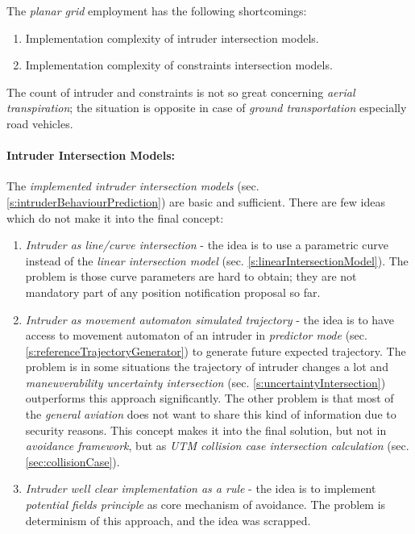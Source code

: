 \noindent The \emph{planar grid} employment has the following shortcomings:
\begin{enumerate}
    \item Implementation complexity of intruder intersection models.
    \item Implementation complexity of constraints intersection models.
\end{enumerate}

\begin{note}
    The count of intruder and constraints is not so great concerning \emph{aerial transpiration}; the situation is opposite in case of \emph{ground transportation} especially road vehicles. 
\end{note}

\paragraph{Intruder Intersection Models:} The \emph{implemented intruder intersection models} (sec. \ref{s:intruderBehaviourPrediction}) are basic and sufficient. There are few ideas which do not make it into the final concept:

\begin{enumerate}
    \item \emph{Intruder as line/curve intersection} - the idea is to use a parametric curve instead of the \emph{linear intersection model} (sec. \ref{s:linearIntersectionModel}). The problem is those curve parameters are hard to obtain; they are not mandatory part of any position notification proposal so far.
	
	\item \emph{Intruder as movement automaton simulated trajectory} - the idea is to have access to movement automaton of an intruder in \emph{predictor mode} (sec. \ref{s:referenceTrajectoryGenerator}) to generate future expected trajectory. The problem is in some situations the trajectory of intruder changes a lot and \emph{maneuverability uncertainty intersection} (sec. \ref{s:uncertaintyIntersection}) outperforms this approach significantly. The other problem is that most of the \emph{general aviation} does not want to share this kind of information due to security reasons.  This concept makes it into the final solution, but not in \emph{avoidance framework}, but as \emph{UTM collision case intersection calculation} (sec. \ref{sec:collisionCase}).
	
	\item \emph{Intruder well clear implementation as a rule} - the idea is to implement \emph{potential fields principle} as core mechanism of avoidance. The problem is determinism of this approach, and the idea was scrapped.
\end{enumerate}

